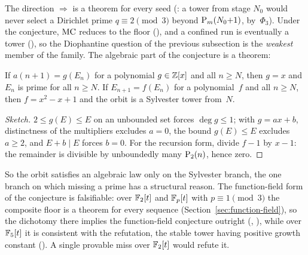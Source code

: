 The direction $\Rightarrow$ is a theorem for every seed
(: a
tower from stage $N_0$ would never select a Dirichlet prime $q \equiv 2
\pmod 3$ beyond $\mathrm{P}_{m}(N_0{+}1)$, by~$\Phi_3$).  Under the conjecture,
$\mathrm{MC}$ reduces to the floor
(), and a confined
run is eventually a tower
(),
so the Diophantine question of the previous subsection is the
\emph{weakest} member of the family.  The algebraic part of the conjecture
is a theorem:

\begin{theorem}
\label{thm:algebraic-part}
If $a(n{+}1) = g(E_n)$ for a polynomial $g \in \mathbb{Z}[x]$ and all $n \geq N$,
then $g = x$ and $E_n$ is prime for all $n \geq N$.  If $E_{n+1} = f(E_n)$
for a polynomial~$f$ and all $n \geq N$, then $f = x^2 - x + 1$ and the
orbit is a Sylvester tower from~$N$.
\end{theorem}

\begin{proof}[Sketch]
$2 \leq g(E) \leq E$ on an unbounded set forces $\deg g \leq 1$; with $g =
ax+b$, distinctness of the multipliers excludes $a = 0$, the bound $g(E)
\leq E$ excludes $a \geq 2$, and $E + b \mid E$ forces $b = 0$.  For the
recursion form, divide $f - 1$ by $x - 1$: the remainder is divisible by
unboundedly many $\mathrm{P}_{2}(n)$, hence zero.
\end{proof}

So the orbit satisfies an algebraic law only on the Sylvester branch,
the one branch on which missing a prime has a structural reason.  The
function-field form of the conjecture is falsifiable: over $\mathbb{F}_2[t]$ and
$\mathbb{F}_p[t]$ with $p \equiv 1 \pmod 3$ the composite floor is a theorem for
every sequence (Section~\ref{sec:function-field}), so the dichotomy there
implies the function-field conjecture outright
(,
),
while over $\mathbb{F}_5[t]$ it is consistent with the refutation, the stable
tower having positive growth constant
().
A single provable miss over $\mathbb{F}_2[t]$ would refute it.

